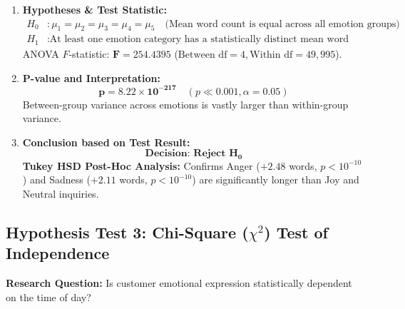\documentclass[11pt, a4paper]{article}
\begin{document}
\begin{enumerate}[leftmargin=1.5em]
    \item \textbf{Hypotheses \& Test Statistic:}
    \begin{align*}
        H_0 &: \mu_1 = \mu_2 = \mu_3 = \mu_4 = \mu_5 \quad \text{(Mean word count is equal across all emotion groups)} \\
        H_1 &: \text{At least one emotion category has a statistically distinct mean word count}
    \end{align*}
    ANOVA $F$-statistic: $\mathbf{F = 254.4395}$ ($\text{Between df} = 4, \text{Within df} = 49,995$).
    
    \item \textbf{P-value and Interpretation:}
    $$\mathbf{p = 8.22 \times 10^{-217}} \quad (p \ll 0.001, \alpha = 0.05)$$
    Between-group variance across emotions is vastly larger than within-group variance.
    
    \item \textbf{Conclusion based on Test Result:}
    $$\mathbf{\text{Decision: Reject } H_0}$$
    \textbf{Tukey HSD Post-Hoc Analysis:} Confirms Anger ($+2.48$ words, $p < 10^{-10}$) and Sadness ($+2.11$ words, $p < 10^{-10}$) are significantly longer than Joy and Neutral inquiries.
\end{enumerate}

\subsection*{Hypothesis Test 3: Chi-Square ($\chi^2$) Test of Independence}
\noindent \textbf{Research Question:} Is customer emotional expression statistically dependent on the time of day?
\end{document}
